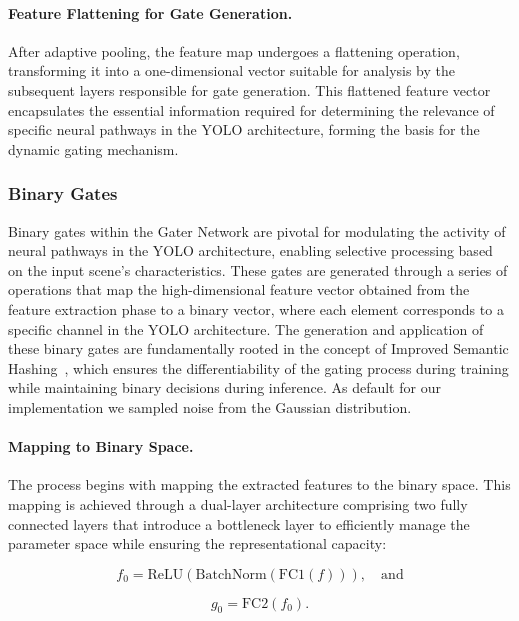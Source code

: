 \paragraph{Feature Flattening for Gate Generation.} After adaptive pooling, the feature map undergoes a flattening operation, transforming it into a one-dimensional vector suitable for analysis by the subsequent layers responsible for gate generation. This flattened feature vector encapsulates the essential information required for determining the relevance of specific neural pathways in the YOLO architecture, forming the basis for the dynamic gating mechanism.

\subsubsection{Binary Gates}
Binary gates within the Gater Network are pivotal for modulating the activity of neural pathways in the YOLO architecture, enabling selective processing based on the input scene's characteristics. These gates are generated through a series of operations that map the high-dimensional feature vector obtained from the feature extraction phase to a binary vector, where each element corresponds to a specific channel in the YOLO architecture. The generation and application of these binary gates are fundamentally rooted in the concept of Improved Semantic Hashing~\cite{kaiser2018discrete,chen2019you}, which ensures the differentiability of the gating process during training while maintaining binary decisions during inference. As default for our implementation we sampled noise from the Gaussian distribution.

\paragraph{Mapping to Binary Space.} The process begins with mapping the extracted features to the binary space. This mapping is achieved through a dual-layer architecture comprising two fully connected layers that introduce a bottleneck layer to efficiently manage the parameter space while ensuring the representational capacity:

\begin{equation}
f_0 = \text{ReLU}(\text{BatchNorm}(\text{FC1}(f))), \quad \text{and}
\label{eq:bottleneck_mapping}
\end{equation}

\begin{equation}
g_0 = \text{FC2}(f_0).
\label{eq:binary_mapping}
\end{equation}

